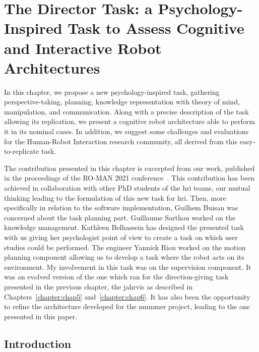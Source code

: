 \documentclass[a4paper,11pt,twoside]{StyleThese}
\begin{document}
	\setcounter{chapter}{8} %
	\dominitoc
	\faketableofcontents
	\fi

\chapter{The Director Task: a Psychology-Inspired Task to Assess Cognitive and Interactive Robot Architectures}
\label{chapter:chap9}
\minitoc

In this chapter, we propose a new psychology-inspired task, gathering perspective-taking, planning, knowledge representation with theory of mind, manipulation, and communication. Along with a precise description of the task allowing its replication, we present a cognitive robot architecture able to perform it in its nominal cases. In addition, we suggest some challenges and evaluations for the Human-Robot Interaction research community, all derived from this easy-to-replicate task.

The contribution presented in this chapter is excerpted from our work, published in the proceedings of the RO-MAN 2021 conference~\cite{sarthou_2021_director}. This contribution has been achieved in collaboration with other PhD students of the \acrshort{hri} teams, our mutual thinking leading to the formulation of this new task for \acrshort{hri}. Then, more specifically in relation to the software implementation, Guilhem Buisan was concerned about the task planning part. Guillaume Sarthou worked on the knowledge management. Kathleen Belhassein has designed the presented task with us giving her psychologist point of view to create a task on which user studies could be performed. The engineer Yannick Riou worked on the motion planning component allowing us to develop a task where the robot acts on its environment. My involvement in this task was on the supervision component. It was an evolved version of the one which ran for the direction-giving task presented in the previous chapter, \ie the \acrshort{jahrvis} as described in Chapters~\ref{chapter:chap5} and~\ref{chapter:chap6}. It has also been the opportunity to refine the architecture developed for the \acrshort{mummer} project, leading to the one presented in this paper.


\section{Introduction}
\end{document}
